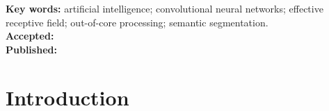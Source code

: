 \documentclass[10pt, indentfirst]{article}
\renewcommand{\headrulewidth}{.5pt}
\renewcommand{\footrulewidth}{0pt}
\begin{document}
\begin{flushleft}
	
	
	\vspace{8pt} 
	\textbf{Key words:} artificial intelligence; convolutional neural networks; effective receptive field; out-of-core processing; semantic segmentation. \\ %
	\vspace{8pt} 
	\textbf{Accepted:} \accepted \\
	\vspace{8pt} 
	\textbf{Published:} \published \\ %
	\vspace{8pt} 
	\DOI
\end{flushleft}
\vspace{-15pt}
\LARGE \hrulefill

\setlength{\abovedisplayskip}{19pt}
\setlength{\belowdisplayskip}{19pt}
\setlength{\abovedisplayshortskip}{9pt}
\setlength{\belowdisplayshortskip}{19pt}

\raggedright
\setlength\parindent{16pt}

\pagestyle{fancy}
\renewcommand{\headrulewidth}{.5pt}
  \renewcommand{\footrulewidth}{0pt}
  \fancyhead{}


\fancyfoot{} 
\fancyfoot[c]{\thepage}
\fancyfoot[r]{\DOI}



\section{Introduction}


\normalsize
\end{document}
